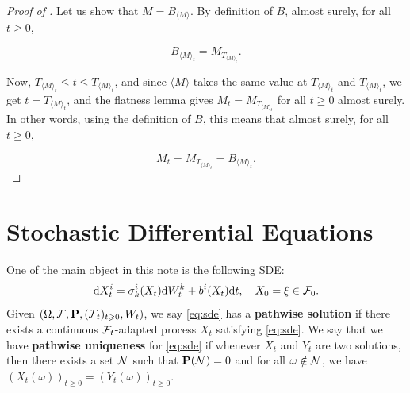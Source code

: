 \begin{proof}[Proof of ]
Let us show that \( M = B_{\langle M \rangle} \). By definition of \( B \), almost surely, for all \( t \geq 0 \),

\[
B_{\langle M \rangle_t} = M_{T_{\langle M \rangle_t}}.
\]

Now, \( T_{\langle M \rangle_t} \leq t \leq T_{\langle M \rangle_t} \), and since \( \langle M \rangle \) takes the same value at \( T_{\langle M \rangle_t} \) and \( T_{\langle M \rangle_t} \), we get \( t = T_{\langle M \rangle_t} \), and the flatness lemma gives \( M_t = M_{T_{\langle M \rangle_t}} \) for all \( t \geq 0 \) almost surely. In other words, using the definition of \( B \), this means that almost surely, for all \( t \geq 0 \),

\[
M_t = M_{T_{\langle M \rangle_t}} = B_{\langle M \rangle_t}.
\]
\end{proof}

\section{Stochastic Differential Equations}
	One of the main object in this note is the following SDE:
	\begin{equation}\label{eq:sde}
		\text{\rm{d}} X_t^i = \sigma^{i}_{k}(X_t) \text{\rm{d}} W_t^k+b^i(X_t) \text{\rm{d}} t, \quad X_0=\xi \in {\mathcal F}_0. 
	\end{equation}
	Given $(\Omega, {\mathcal F}, {\mathbf P}, ({\mathcal F}_t)_{t\geqslant 0},W_t)$, we say \eqref{eq:sde} has a {\bf pathwise solution} if there exists a continuous ${\mathcal F}_t$-adapted process $X_t$ satisfying \eqref{eq:sde}. We say that we have {\bf pathwise uniqueness} for \eqref{eq:sde} if whenever $X_t$ and $Y_t$ are two solutions, then there exists a set ${\mathcal N}$ such that ${\mathbf P}({\mathcal N})=0$ and for all $\omega\notin {\mathcal N}$, we have $(X_t(\omega))_{t\geq 0}=(Y_t(\omega))_{t\geq 0}$.
	
